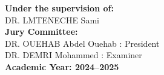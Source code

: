 \documentclass[12pt,a4paper]{report}
\begin{document}
\begin{center}
    \vspace{1cm}
    \textbf{Under the supervision of:} \\[0.2cm]
    DR. LMTENECHE Sami \\


    
    \vspace{1cm}
    \textbf{Jury Committee:} \\[0.2cm]
    DR.  OUEHAB Abdel Ouehab : President \\
    DR. DEMRI Mohammed : Examiner \\

    \vfill
    \textbf{Academic Year: 2024–2025}

\end{center}

\newpage
\newenvironment{Summary}{
    \newpage
    \phantomsection
    \addcontentsline{toc}{chapter}{Summary}
    \begin{center}
        {\color{mintgreen} \rule{\textwidth}{2pt} }\\[0.3cm]
        {\Large \textbf{Summary}}\\[0.3cm]
        {\color{mintgreen} \rule{0.8\textwidth}{1.5pt} }
    \end{center}
    \vspace{0.5cm}
    \noindent
}{
    \vspace{0.5cm}
    \begin{center}
        {\color{mintgreen} \rule{0.8\textwidth}{1.5pt} }\\[0.3cm]
        {\color{mintgreen} \rule{\textwidth}{2pt} }
    \end{center}
}
\end{document}
